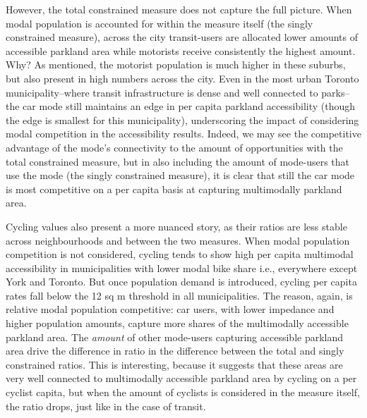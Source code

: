 \documentclass[
11pt, %
oneside, %
english, %
singlespacing, %
]{macthesis} %
\begin{document}
However, the total constrained measure does not capture the full picture. When modal population is accounted for within the measure itself (the singly constrained measure), across the city transit-users are allocated lower amounts of accessible parkland area while motorists receive consistently the highest amount. Why? As mentioned, the motorist population is much higher in these suburbs, but also present in high numbers across the city. Even in the most urban Toronto municipality--where transit infrastructure is dense and well connected to parks--the car mode still maintains an edge in per capita parkland accessibility (though the edge is smallest for this municipality), underscoring the impact of considering modal competition in the accessibility results. Indeed, we may see the competitive advantage of the mode's connectivity to the amount of opportunities with the total constrained measure, but in also including the amount of mode-users that use the mode (the singly constrained measure), it is clear that still the car mode is most competitive on a per capita basis at capturing multimodally parkland area.

Cycling values also present a more nuanced story, as their ratios are less stable across neighbourhoods and between the two measures. When modal population competition is not considered, cycling tends to show high per capita multimodal accessibility in municipalities with lower modal bike share i.e., everywhere except York and Toronto. But once population demand is introduced, cycling per capita rates fall below the 12 sq m threshold in all municipalities. The reason, again, is relative modal population competitive: car users, with lower impedance and higher population amounts, capture more shares of the multimodally accessible parkland area. The \emph{amount} of other mode-users capturing accessible parkland area drive the difference in ratio in the difference between the total and singly constrained ratios. This is interesting, because it suggests that these areas are very well connected to multimodally accessible parkland area by cycling on a per cyclist capita, but when the amount of cyclists is considered in the measure itself, the ratio drops, just like in the case of transit.
\end{document}
